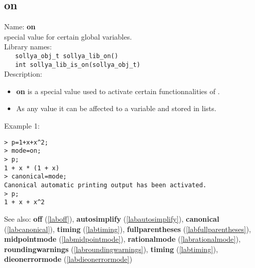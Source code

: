 \subsection{on}
\label{labon}
\noindent Name: \textbf{on}\\
\phantom{aaa}special value for certain global variables.\\[0.2cm]
\noindent Library names:\\
\verb|   sollya_obj_t sollya_lib_on()|\\
\verb|   int sollya_lib_is_on(sollya_obj_t)|\\[0.2cm]
\noindent Description: \begin{itemize}

\item \textbf{on} is a special value used to activate certain functionnalities 
   of \sollya.

\item As any value it can be affected to a variable and stored in lists.
\end{itemize}
\noindent Example 1: 
\begin{center}\begin{minipage}{15cm}\begin{Verbatim}[frame=single,commandchars=\\\|\~]
> p=1+x+x^2;
> mode=on;
> p;
1 + x * (1 + x)
> canonical=mode;
Canonical automatic printing output has been activated.
> p;
1 + x + x^2
\end{Verbatim}
\end{minipage}\end{center}
See also: \textbf{off} (\ref{laboff}), \textbf{autosimplify} (\ref{labautosimplify}), \textbf{canonical} (\ref{labcanonical}), \textbf{timing} (\ref{labtiming}), \textbf{fullparentheses} (\ref{labfullparentheses}), \textbf{midpointmode} (\ref{labmidpointmode}), \textbf{rationalmode} (\ref{labrationalmode}), \textbf{roundingwarnings} (\ref{labroundingwarnings}), \textbf{timing} (\ref{labtiming}), \textbf{dieonerrormode} (\ref{labdieonerrormode})
